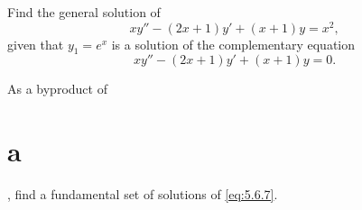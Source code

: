 \setcounter{example}{0}
\setcounter{equation}{5}
\begin{example}
  \label{example:5.6.1} \rm \mbox{}
  \newline
  \begin{alist}
    \item %
    Find the general solution of
    \begin{equation}
      \label{eq:5.6.6}xy''-(2x+1)y'+(x+1)y=x^{2},
    \end{equation}
    given that $y_{1}=e^{x}$ is a solution of the complementary equation
    \begin{equation}
      \label{eq:5.6.7}xy''-(2x+1)y'+(x+1)y=0.
    \end{equation}

    \item %
    As a byproduct of \part{a}, find a fundamental set of solutions of \eqref{eq:5.6.7}.
  \end{alist}
\end{example}
\setcounter{equation}{7}
